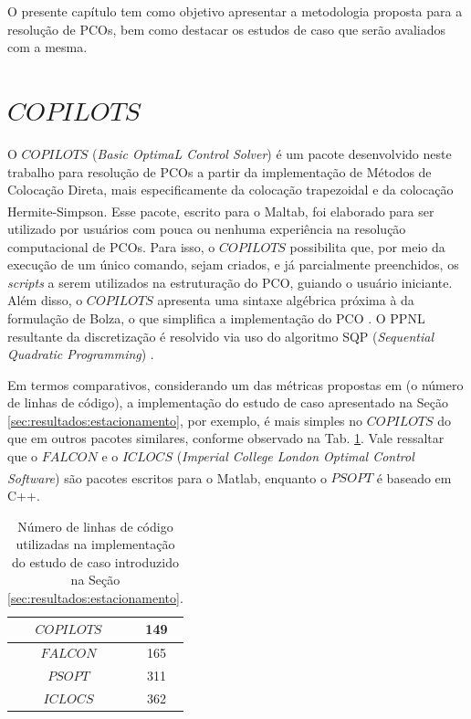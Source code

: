 
O presente capítulo tem como objetivo apresentar a metodologia proposta para a resolução de PCOs, bem como destacar os estudos de caso que serão avaliados com a mesma. 

\section{\boldmath$ COPILOTS $}

O $COPILOTS$ (\textit{Basic OptimaL Control Solver}) é um pacote desenvolvido neste trabalho para resolução de PCOs a partir da implementação de Métodos de Colocação Direta, mais especificamente da colocação trapezoidal e da colocação Hermite-Simpson. Esse pacote, escrito para o Maltab\textsuperscript{\textregistered}, foi elaborado para ser utilizado por usuários com pouca ou nenhuma experiência na resolução computacional de PCOs. Para isso, o $COPILOTS$ possibilita que, por meio da execução de um único comando, sejam criados, e já parcialmente preenchidos, os \textit{scripts} a serem utilizados na estruturação do PCO, guiando o usuário iniciante. Além disso, o $COPILOTS$ apresenta uma sintaxe algébrica próxima à da formulação de Bolza, o que simplifica a implementação do PCO \cite{febbo_nloptcontrol_2020}. O PPNL resultante da discretização é resolvido via uso do algoritmo SQP (\textit{Sequential Quadratic Programming}) \cite{vanderplaats_numerical_1984}.	

Em termos comparativos, considerando um das métricas propostas em  (o número de linhas de código), a implementação do estudo de caso apresentado na Seção \ref{sec:resultados:estacionamento}, por exemplo, é mais simples no $ COPILOTS $ do que em outros pacotes similares, conforme observado na Tab. \ref{tab:revisao:comparacaoLinhas}. Vale ressaltar que o $ FALCON $ e o $ ICLOCS $ (\textit{Imperial College London Optimal Control Software}) \cite{falugi_iclocs2_2018} são pacotes escritos para o Matlab\textsuperscript{\textregistered}, enquanto o $ PSOPT $ é baseado em C++. 

\begin{table}[!htb]
	\caption{Número de linhas de código utilizadas na implementação do estudo de caso introduzido na Seção \ref{sec:resultados:estacionamento}.}
	\label{tab:revisao:comparacaoLinhas}
	\centering{}
	\begin{tabular}{|c|c|}
		\hline
		$COPILOTS$  & 149 \\ \hline
		$ FALCON $ & 165 \\ \hline
		$ PSOPT $    & 311 \\ \hline
		$ ICLOCS $   & 362 \\ \hline
	\end{tabular}
\end{table}

